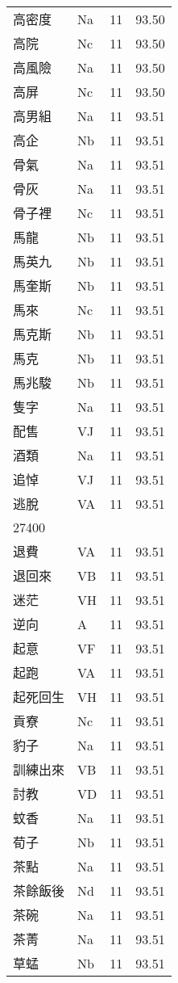 \documentclass[twocolumn]{book}
\begin{document}
\begin{supertabular}{llrr}
高密度 & Na & 11 &  93.50\\
高院 & Nc & 11 &  93.50\\
高風險 & Na & 11 &  93.50\\
高屏 & Nc & 11 &  93.50\\
高男組 & Na & 11 &  93.51\\
高企 & Nb & 11 &  93.51\\
骨氣 & Na & 11 &  93.51\\
骨灰 & Na & 11 &  93.51\\
骨子裡 & Nc & 11 &  93.51\\
馬龍 & Nb & 11 &  93.51\\
馬英九 & Nb & 11 &  93.51\\
馬奎斯 & Nb & 11 &  93.51\\
馬來 & Nc & 11 &  93.51\\
馬克斯 & Nb & 11 &  93.51\\
馬克 & Nb & 11 &  93.51\\
馬兆駿 & Nb & 11 &  93.51\\
隻字 & Na & 11 &  93.51\\
配售 & VJ & 11 &  93.51\\
酒類 & Na & 11 &  93.51\\
追悼 & VJ & 11 &  93.51\\
逃脫 & VA & 11 &  93.51\\
27400\\
退費 & VA & 11 &  93.51\\
退回來 & VB & 11 &  93.51\\
迷茫 & VH & 11 &  93.51\\
逆向 & A & 11 &  93.51\\
起意 & VF & 11 &  93.51\\
起跑 & VA & 11 &  93.51\\
起死回生 & VH & 11 &  93.51\\
貢寮 & Nc & 11 &  93.51\\
豹子 & Na & 11 &  93.51\\
訓練出來 & VB & 11 &  93.51\\
討教 & VD & 11 &  93.51\\
蚊香 & Na & 11 &  93.51\\
荀子 & Nb & 11 &  93.51\\
茶點 & Na & 11 &  93.51\\
茶餘飯後 & Nd & 11 &  93.51\\
茶碗 & Na & 11 &  93.51\\
茶菁 & Na & 11 &  93.51\\
草蜢 & Nb & 11 &  93.51\\

\end{supertabular}
\end{document}

